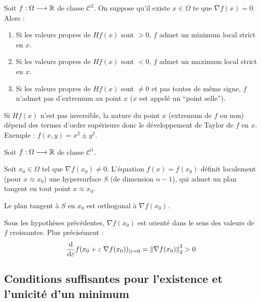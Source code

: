 \begin{lemme}
    Soit $f : \Omega \longrightarrow \mathbb{R}$ de classe $\mathcal{C}^2$. On suppose qu'il existe
    $x \in \Omega$ te que $\nabla f(x) = 0$. Alors :
    \begin{enumerate}[label=-]
        \item Si les valeurs propres de $Hf(x)$ sont $> 0$, $f$ admet un minimum local strict
            en $x$.

        \item Si les valeurs propres de $Hf(x)$ sont $< 0$, $f$ admet un maximum local
            strict en $x$.

        \item Si les valeurs propres de $Hf(x)$ sont $\ne 0$ et pas toutes de même signe,
            $f$ n'admet pas d'extremum au point $x$ ($x$ est appelé un ``point selle'').
    \end{enumerate}
\end{lemme}

\begin{remark}
    Si $Hf(x)$ n'est pas inversible, la nature du point $x$ (extremum de $f$ ou non) dépend
    des termes d'ordre supérieure donc le développement de Taylor de $f$ en $x$. Exemple :
    $f(x,y) = x^2 \pm y^2$.
\end{remark}

\begin{lemme}
    Soit $f : \Omega \longrightarrow \mathbb{R}$ de classe $\mathcal{C}^1$.

    Soit $x_0 \in \Omega$ tel que $\nabla f(x_0) \ne 0$. L'équation $f(x) = f(x_0)$
    définit localement (pour $x \approx x_0$) une hypersurface $S$ (de dimension $n-1$),
    qui admet un plan tangent en tout point $x \approx x_0$.

    Le plan tangent à $S$ en $x_0$ est orthogonal à $\nabla f(x_0)$.
\end{lemme}

\begin{lemme}
    Sous les hypothèses précédentes, $\nabla f(x_0)$ est orienté dans le sens
    des valeurs de $f$ croissantes. Plus précisément :
    \[
        \displaystyle\frac{\text{d}}{\text{d} \varepsilon} f(x_0 + \varepsilon \; \nabla f(x_0))_{|\varepsilon=0}
        = \left\lVert\nabla f(x_0)\right\rVert^2_2 > 0
    \]
\end{lemme}

\subsection{Conditions suffisantes pour l'existence et l'unicité d'un minimum}

